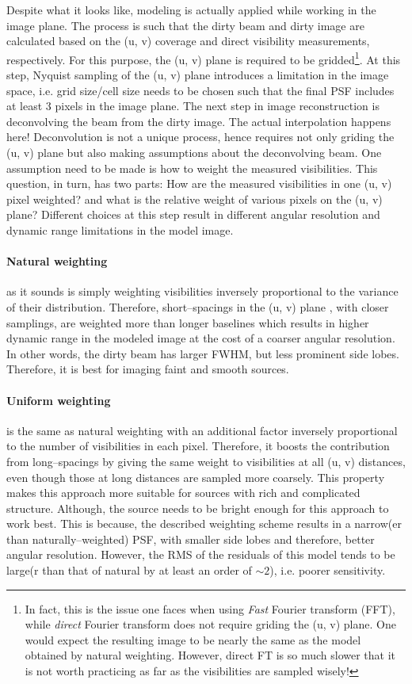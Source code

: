 \documentclass[paper=a4, fontsize=11pt]{scrartcl} %
\numberwithin{equation}{section} %
\numberwithin{figure}{section} %
\numberwithin{table}{section} %
\begin{document}
Despite what it looks like, modeling is actually applied while working in the image plane. The process is such that the dirty beam and dirty image are calculated based on the (u, v) coverage and direct visibility measurements, respectively. For this purpose, the (u, v) plane is required to be gridded\footnote{In fact, this is the issue one faces when using \emph{Fast} Fourier transform (FFT), while \emph{direct} Fourier transform does not require griding the (u, v) plane. One would expect the resulting image to be nearly the same as the model obtained by natural weighting. However, direct FT is so much slower that it is not worth practicing as far as the visibilities are sampled wisely!}. At this step, Nyquist sampling of the (u, v) plane introduces a limitation in the image space, i.e. grid size/cell size needs to  be chosen such that the final PSF includes at least 3 pixels in the image plane. The next step in image reconstruction is deconvolving the beam from the dirty image. The actual interpolation happens here! Deconvolution is not a unique process, hence requires not only griding the (u, v) plane but also making assumptions about the deconvolving beam. One assumption need to be made is how to weight the measured visibilities. This question, in turn, has two parts: How are the measured visibilities in one (u, v) pixel weighted? and what is the relative weight of various pixels on the (u, v) plane? Different choices at this step result in different angular resolution and dynamic range limitations in the model image.

\paragraph*{Natural weighting} as it sounds is simply weighting visibilities inversely proportional to the variance of their distribution.
Therefore, short--spacings in the (u, v) plane , with closer samplings, are weighted more than longer baselines which results in higher dynamic range in the modeled image at the cost of a coarser angular resolution. In other words, the dirty beam has larger FWHM, but less prominent side lobes. Therefore, it is best for imaging faint and smooth sources.

\paragraph*{Uniform weighting} is the same as natural weighting with an additional factor inversely proportional to the number of visibilities in each pixel. Therefore, it boosts the contribution from long--spacings by giving the same weight to visibilities at all (u, v) distances, even though those at long distances are sampled more coarsely. This property makes this approach more suitable for sources with rich and complicated structure. Although, the source needs to be bright enough for this approach to work best. This is because, the described weighting scheme results in a narrow(er than naturally--weighted) PSF, with smaller side lobes and therefore, better angular resolution. However, the RMS of the residuals of this model tends to be large(r than that of natural by at least an order of $\sim 2$), i.e. poorer sensitivity.
\end{document}
